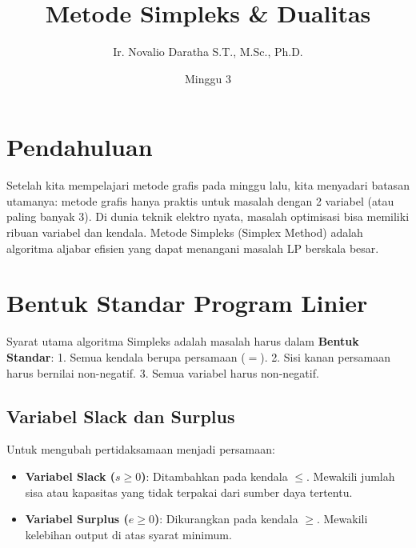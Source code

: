 \documentclass[11pt, a4paper]{article}
\title{\vspace{-1cm}\color{UNIBBlue}\textbf{Metode Simpleks \& Dualitas}\vspace{-0.5cm}}
\author{Ir. Novalio Daratha S.T., M.Sc., Ph.D.}
\date{Minggu 3}
\begin{document}
\maketitle

\section{Pendahuluan}
Setelah kita mempelajari metode grafis pada minggu lalu, kita menyadari batasan utamanya: metode grafis hanya praktis untuk masalah dengan 2 variabel (atau paling banyak 3). Di dunia teknik elektro nyata, masalah optimisasi bisa memiliki ribuan variabel dan kendala. Metode Simpleks (Simplex Method) adalah algoritma aljabar efisien yang dapat menangani masalah LP berskala besar.

\section{Bentuk Standar Program Linier}
Syarat utama algoritma Simpleks adalah masalah harus dalam \textbf{Bentuk Standar}:
1. Semua kendala berupa persamaan ($=$).
2. Sisi kanan persamaan harus bernilai non-negatif.
3. Semua variabel harus non-negatif.

\subsection{Variabel Slack dan Surplus}
Untuk mengubah pertidaksamaan menjadi persamaan:
\begin{itemize}
    \item \textbf{Variabel Slack ($s \ge 0$)}: Ditambahkan pada kendala $\le$. Mewakili jumlah sisa atau kapasitas yang tidak terpakai dari sumber daya tertentu.
    \item \textbf{Variabel Surplus ($e \ge 0$)}: Dikurangkan pada kendala $\ge$. Mewakili kelebihan output di atas syarat minimum.
\end{itemize}
\end{document}
